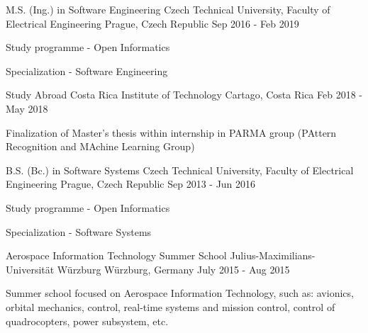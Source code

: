 \begin{cventries}
  \cventry
    {M.S. (Ing.) in Software Engineering}
    {Czech Technical University, Faculty of Electrical Engineering}
    {Prague, Czech Republic}
    {Sep 2016 - Feb 2019}
    {
      \begin{cvitems}
        \item {Study programme - Open Informatics}
        \item {Specialization - Software Engineering}
      \end{cvitems}
    }

    \cventry
    {Study Abroad}
    {Costa Rica Institute of Technology}
    {Cartago, Costa Rica}
    {Feb 2018 - May 2018}
    {
      \begin{cvitems}
        \item {Finalization of Master's thesis within internship in PARMA group (PAttern Recognition and MAchine Learning Group)}
      \end{cvitems}
    }

  \cventry
    {B.S. (Bc.) in Software Systems}
    {Czech Technical University, Faculty of Electrical Engineering}
    {Prague, Czech Republic}
    {Sep 2013 - Jun 2016}
    {
      \begin{cvitems}
        \item {Study programme - Open Informatics}
        \item {Specialization - Software Systems}
      \end{cvitems}
    }

  \cventry
    {Aerospace Information Technology Summer School}
    {Julius-Maximilians-Universität Würzburg}
    {Würzburg, Germany}
    {July 2015 - Aug 2015}
     {
      \begin{cvitems}
        \item {Summer school focused on Aerospace Information Technology, such as: avionics, orbital mechanics, control, real-time systems and mission control, control of quadrocopters, power subsystem, etc.}
      \end{cvitems}
    }
\end{cventries}
